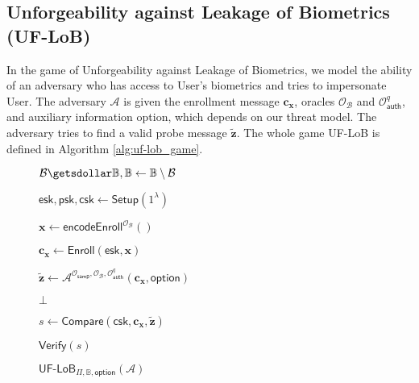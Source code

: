 
\subsection{Unforgeability against Leakage of Biometrics (UF-LoB)}
\label{sec:uf-lob_game}

In the game of Unforgeability against Leakage of Biometrics, we model the ability of an adversary who has access to \textsf{User}'s biometrics and tries to impersonate \textsf{User}. The adversary $\mathcal{A}$ is given the enrollment message $\mathbf{c_x}$, oracles $\mathcal{O}_\mathcal{B}$ and $\mathcal{O}_\textsf{auth}^q$, and auxiliary information \textsf{option}, which depends on our threat model. The adversary tries to find a valid probe message $\mathbf{\tilde{z}}$. The whole game \textsf{UF-LoB} is defined in Algorithm \ref{alg:uf-lob_game}.

\begin{figure}[h]
\centering
	\begin{minipage}[t]{0.6\linewidth}
	\centering
	\begin{algorithm}[H]
	\caption{$\textsf{UF-LoB}_{\Pi, \mathbb{B}, \textsf{option}}(\mathcal{A})$}
	\label{alg:uf-lob_game}
	\begin{algorithmic}[1]
		\State $\mathcal{B} \getsdollar \mathbb{B}, \mathbb{B} \gets \mathbb{B} \setminus \mathcal{B}$

		\State $\textsf{esk}, \textsf{psk}, \textsf{csk} \gets \textsf{Setup}(1^\lambda)$

		\State $\mathbf{x} \gets \textsf{encodeEnroll}^{\mathcal{O}_{\mathcal{B}}}()$

		\State $\mathbf{c_x} \gets \textsf{Enroll}(\textsf{esk}, \mathbf{x})$
		
		\State ${\mathbf{\tilde{z}}} \gets \mathcal{A}^{ \mathcal{O}_{\textsf{samp}}, \mathcal{O}_{\mathcal{B}}, \mathcal{O}_\textsf{auth}^q } ( \mathbf{c_x}, \textsf{option} )$

		
		\State \Return $\bot$
		
		\EndIf

		\State $s \gets \textsf{Compare}( \textsf{csk}, \mathbf{c_x}, \mathbf{\tilde{z}} )$

		\State \Return $\textsf{Verify}(s)$
	\end{algorithmic}
	\end{algorithm}
	\end{minipage}
	
\label{fig:uf-lob_game}
\end{figure}


